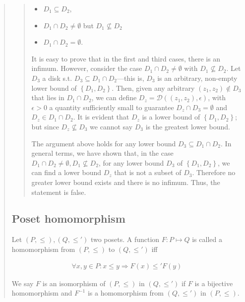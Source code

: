 \documentclass[a4paper, 12pt]{article}
\begin{document}
\begin{quote}
\begin{quote}
\begin{itemize}
    \item $D_1 \subseteq  D_2$, 
    \item $ D_1 \cap D_2 \neq \emptyset$ but $D_1 \not\subseteq D_2$
    \item $D_1 \cap D_2 = \emptyset$. 
\end{itemize}

It is easy to prove that in the first and third cases, there is an infimum.
However, consider the case $D_1 \cap D_2 \neq \emptyset$ with $D_1 \not\subseteq
D_2$. Let $D_3$ a disk s.t. $D_3 \subseteq D_1 \cap D_2$---this is, $D_3$ is an
arbitrary, non-empty lower bound of $\left\{ D_1, D_2 \right\} $. Then, given
any arbitrary $(z_1, z_2) \not\in D_3$ that
lies in $D_1 \cap D_2$, we can define $D_z = \mathcal{D}((z_1, z_2), \epsilon)$, with
$\epsilon > 0$ a quantity sufficiently small to guarantee $D_z \cap D_3 =
\emptyset$ and $D_z \in D_1 \cap D_2$. It is evident that $D_z$ is a lower bound
of $\left\{ D_1, D_2 \right\} $; but since $D_z \not\subseteq D_3$ we cannot say
$D_3$ is the greatest lower bound.

The argument above holds for any lower bound $D_3 \subseteq D_1 \cap D_2$. In
general terms, we have shown that, in the case $D_1 \cap D_2 \neq \emptyset, D_1
\not\subseteq D_2$, for any lower bound $D_3$ of $\left\{ D_1, D_2 \right\} $,
we can find a lower bound $D_z$ that is not a subset of $D_3$. Therefore no
greater lower bound exists and there is no infimum. Thus, the statement is
false.





\end{quote}
\normalsize



\subsection{Poset homomorphism}

Let $(P, \leq), (Q, \leq')  $ two posets. A function $F : P \mapsto Q$ is called
a homomorphism from $(P, \leq) $ to $(Q, \leq')$ iff 

\begin{align*}
    \forall x, y \in P : x \leq y \Rightarrow F(x) \leq' F(y)
\end{align*}


We say $F$ is an isomorphism of $(P, \leq) $ in $(Q, \leq') $ if $F$ is a
bijective homomorphism and $F^{-1}$ is a homomorphism from $(Q, \leq') $ in
$(P, \leq) $. 



\end{quote}
\end{document}
